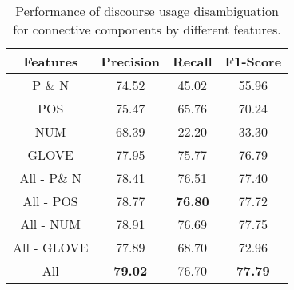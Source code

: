 \begin{table}[h]
\centering
\begin{tabular}{|c|c|c|c|}
\hline

\bf Features        & \bf Precision & \bf Recall & \bf F1-Score \\ \hline
    P \& N          &     74.52     &     45.02  &     55.96    \\ \hline
    POS             &     75.47     &     65.76  &     70.24    \\ \hline
    NUM             &     68.39     &     22.20  &     33.30    \\ \hline
    GLOVE           &     77.95     &     75.77  &     76.79    \\ \hline
    All - P\& N     &     78.41     &     76.51  &     77.40    \\ \hline
    All - POS       &     78.77     & \bf 76.80  &     77.72    \\ \hline
    All - NUM       &     78.91     &     76.69  &     77.75    \\ \hline
    All - GLOVE     &     77.89     &     68.70  &     72.96    \\ \hline
    All             & \bf 79.02     &     76.70  & \bf 77.79    \\ \hline %

\end{tabular}
\caption{\label{t:recognition-features} Performance of discourse usage
disambiguation for connective components by different features. }
\end{table}
